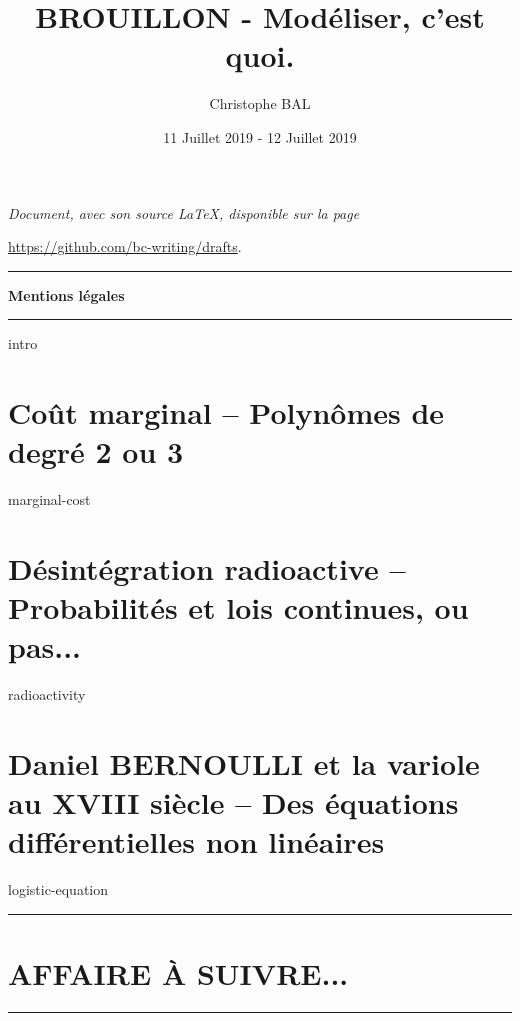 \documentclass[12pt]{amsart}
\let\oldsection\section
\renewcommand\section[1]{\vfill\pagebreak\oldsection{#1}}
\begin{document}
\title{BROUILLON - Modéliser, c'est quoi.}
\author{Christophe BAL}
\date{11 Juillet 2019 - 12 Juillet 2019}

\maketitle

\begin{center}
	\itshape
	Document, avec son source \LaTeX, disponible sur la page
	
	\url{https://github.com/bc-writing/drafts}.
\end{center}


\bigskip


\begin{center}
	\hrule\vspace{.3em}
	{
		\fontsize{1.35em}{1em}\selectfont
		\textbf{Mentions \og légales \fg}
	}
			
	\vspace{0.45em}
	\doclicenseThis
	\hrule
\end{center}



\setcounter{tocdepth}{2}
\tableofcontents



{intro}





\section{Coût marginal -- Polynômes de degré 2 ou 3}

{marginal-cost}



\section{Désintégration radioactive -- Probabilités et lois continues, ou pas...}

{radioactivity}



\section{Daniel BERNOULLI et la variole au XVIII\ieme{} siècle -- Des équations différentielles non linéaires}

{logistic-equation}



%



\bigskip

\hrule

\oldsection{AFFAIRE À SUIVRE...}

\bigskip

\hrule
\end{document}
